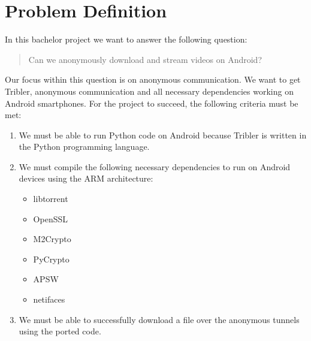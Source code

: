 \chapter{Problem Definition}

In this bachelor project we want to answer the following question:

\begin{quote}
Can we anonymously download and stream videos on Android?
\end{quote}

Our focus within this question is on anonymous communication. We want to get Tribler, anonymous communication and all necessary dependencies working on Android smartphones. For the project to succeed, the following criteria must be met:
\begin{enumerate}
\item We must be able to run Python code on Android because Tribler is written in the Python programming language.
\item We must compile the following necessary dependencies to run on Android devices using the ARM architecture:
\begin{itemize}
\item libtorrent
\item OpenSSL
\item M2Crypto
\item PyCrypto
\item APSW
\item netifaces
\end{itemize}
\item We must be able to successfully download a file over the anonymous tunnels using the ported code.
\end{enumerate}

